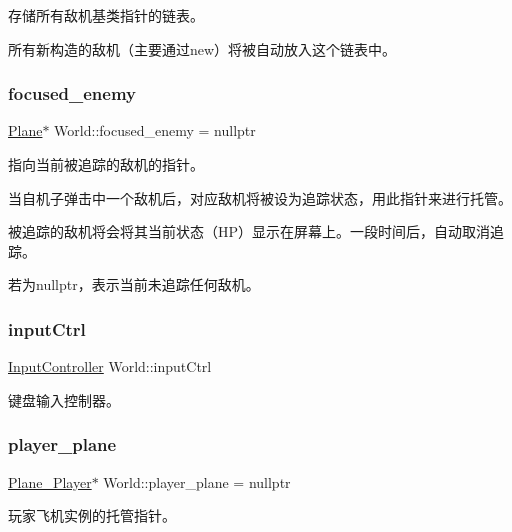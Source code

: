 存储所有敌机基类指针的链表。 

所有新构造的敌机（主要通过new）将被自动放入这个链表中。 \mbox{\label{class_world_ac8553c1be4fb1e79e94bf9f63f834963}} 
\subsubsection{\texorpdfstring{focused\+\_\+enemy}{focused\_enemy}}
{\footnotesize\ttfamily \hyperlink{class_plane}{Plane}$\ast$ World\+::focused\+\_\+enemy = nullptr}



指向当前被追踪的敌机的指针。 

当自机子弹击中一个敌机后，对应敌机将被设为追踪状态，用此指针来进行托管。

被追踪的敌机将会将其当前状态（\+H\+P）显示在屏幕上。一段时间后，自动取消追踪。

若为nullptr，表示当前未追踪任何敌机。 \mbox{\label{class_world_ae4cc86850d7092edbb7648d4cbd093aa}} 
\subsubsection{\texorpdfstring{input\+Ctrl}{inputCtrl}}
{\footnotesize\ttfamily \hyperlink{class_input_controller}{Input\+Controller} World\+::input\+Ctrl}



键盘输入控制器。 

\mbox{\label{class_world_ada7a87d1778bfc543635656ea8f12d3f}} 
\subsubsection{\texorpdfstring{player\+\_\+plane}{player\_plane}}
{\footnotesize\ttfamily \hyperlink{class_plane___player}{Plane\+\_\+\+Player}$\ast$ World\+::player\+\_\+plane = nullptr}



玩家飞机实例的托管指针。 

\mbox{\label{class_world_ad9027ba6a4913c21191e7321e9bb2f9f}} 

